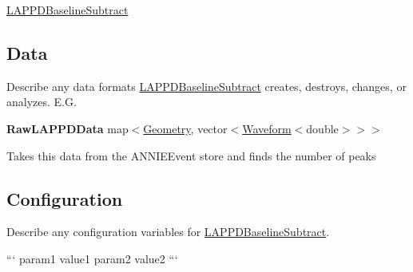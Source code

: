 \hyperlink{classLAPPDBaselineSubtract}{L\-A\-P\-P\-D\-Baseline\-Subtract}

\subsection*{Data}

Describe any data formats \hyperlink{classLAPPDBaselineSubtract}{L\-A\-P\-P\-D\-Baseline\-Subtract} creates, destroys, changes, or analyzes. E.\-G.

{\bfseries Raw\-L\-A\-P\-P\-D\-Data} {\ttfamily map$<$\hyperlink{classGeometry}{Geometry}, vector$<$\hyperlink{classWaveform}{Waveform}$<$double$>$$>$$>$}
\begin{DoxyItemize}
\item Takes this data from the {\ttfamily A\-N\-N\-I\-E\-Event} store and finds the number of peaks
\end{DoxyItemize}

\subsection*{Configuration}

Describe any configuration variables for \hyperlink{classLAPPDBaselineSubtract}{L\-A\-P\-P\-D\-Baseline\-Subtract}.

``` param1 value1 param2 value2 ``` 